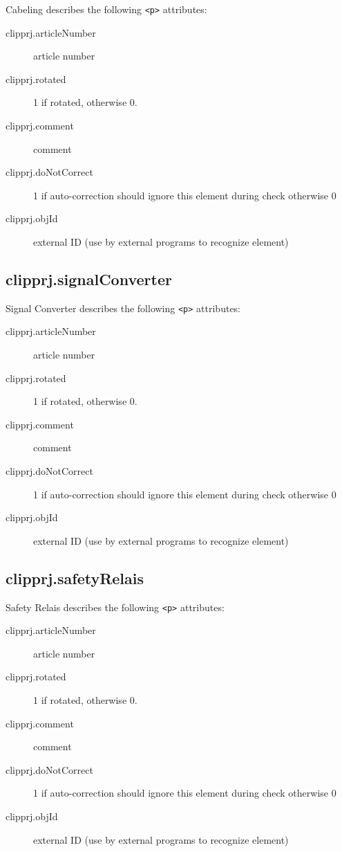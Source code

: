 \documentclass[%
	a4paper,
	oneside,
	listof=numbered,
	parskip=half,
	headsepline=true,
	footsepline=false,
	normalheadings,
	0.7headlines,
	headexclude,
	]{scrbook}
\begin{document}
Cabeling describes the following \verb|<p>| attributes: 

\begin{description}
	\item[clipprj.articleNumber] article number 
	\item[clipprj.rotated] 1 if rotated, otherwise 0. 
	\item[clipprj.comment] comment 
	\item[clipprj.doNotCorrect] 1 if auto-correction should ignore this element during check otherwise 0 
	\item[clipprj.objId] external ID (use by external programs to recognize element) 
\end{description}

\subsection{clipprj.signalConverter}
 
Signal Converter describes the following \verb|<p>| attributes: 

\begin{description}
	\item[clipprj.articleNumber] article number 
	\item[clipprj.rotated] 1 if rotated, otherwise 0. 
	\item[clipprj.comment] comment 
	\item[clipprj.doNotCorrect] 1 if auto-correction should ignore this element during check otherwise 0 
	\item[clipprj.objId] external ID (use by external programs to recognize element) 
\end{description}

\subsection{clipprj.safetyRelais}
 
Safety Relais describes the following \verb|<p>| attributes: 

\begin{description}
	\item[clipprj.articleNumber] article number 
	\item[clipprj.rotated] 1 if rotated, otherwise 0. 
	\item[clipprj.comment] comment 
	\item[clipprj.doNotCorrect] 1 if auto-correction should ignore this element during check otherwise 0 
	\item[clipprj.objId] external ID (use by external programs to recognize element) 
\end{description}
\end{document}
